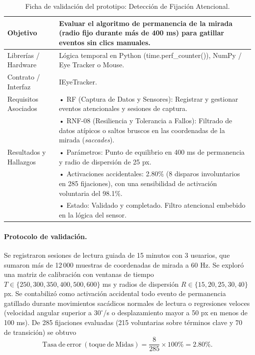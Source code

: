 \begin{table}[H]
    \centering
    \caption{Ficha de validación del prototipo: Detección de Fijación Atencional.}
    \label{tab:ficha_f12}
    \begin{tabular}{L{3.2cm} L{11.0cm}}
        \toprule
        Objetivo & Evaluar el algoritmo de permanencia de la mirada (radio fijo durante más de 400 ms) para gatillar eventos sin clics manuales. \\ \midrule
        Librerías / Hardware & Lógica temporal en Python (time.perf\_counter()), NumPy / Eye Tracker o Mouse. \\ \midrule
        Contrato / Interfaz & IEyeTracker. \\ \midrule
        Requisitos Asociados &
        • RF (Captura de Datos y Sensores): Registrar y gestionar eventos atencionales y sesiones de captura. \vspace{0.1cm} \\
        & • RNF-08 (Resiliencia y Tolerancia a Fallos): Filtrado de datos atípicos o saltos bruscos en las coordenadas de la mirada (\textit{saccades}). \\ \midrule
        Resultados y Hallazgos &
        • Parámetros: Punto de equilibrio en 400 ms de permanencia y radio de dispersión de 25 px. \vspace{0.1cm} \\
        & • Activaciones accidentales: 2.80\% (8 disparos involuntarios en 285 fijaciones), con una sensibilidad de activación voluntaria del 98.1\%. \vspace{0.1cm} \\
        & • Estado: Validado y completado. Filtro atencional embebido en la lógica del sensor. \\ \bottomrule
    \end{tabular}
\end{table}
 
\paragraph{Protocolo de validación.} Se registraron sesiones de lectura guiada de 15 minutos con 3 usuarios, que sumaron más de 12\,000 muestras de coordenadas de mirada a 60 Hz. Se exploró una matriz de calibración con ventanas de tiempo $T \in \{250, 300, 350, 400, 500, 600\}$ ms y radios de dispersión $R \in \{15, 20, 25, 30, 40\}$ px. Se contabilizó como activación accidental todo evento de permanencia gatillado durante movimientos sacádicos normales de lectura o regresiones veloces (velocidad angular superior a $30^\circ$/s o desplazamiento mayor a 50 px en menos de 100 ms). De 285 fijaciones evaluadas (215 voluntarias sobre términos clave y 70 de transición) se obtuvo
\[ \mathrm{Tasa\ de\ error\ (toque\ de\ Midas)} = \frac{8}{285} \times 100\% = 2.80\%. \]
 
